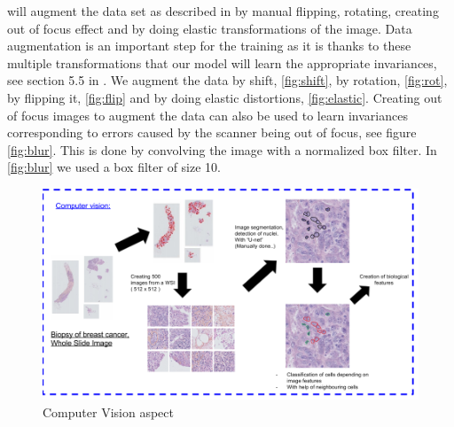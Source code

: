 \documentclass[a4paper,10pt]{article}
\begin{document}
will augment the data set as described in \citet{UNet} by manual
flipping, rotating, creating out of focus effect and by doing elastic
transformations of the image. Data augmentation is an important step
for the training as it is thanks to these multiple transformations
that our model will learn the appropriate invariances,  see section
5.5 in \citep{bishop2006pattern}. We augment the data by shift,
\ref{fig:shift}, by rotation, \ref{fig:rot}, by flipping it,
\ref{fig:flip} and by doing elastic distortions,
\ref{fig:elastic}. Creating out of focus images to augment the data
can also be used to learn invariances corresponding to errors caused
by the scanner being out of focus, see figure \ref{fig:blur}. This is
done by convolving the image with a normalized box filter. In
\ref{fig:blur} we used a box filter of size 10.  


\begin{figure}[!ht]
\centering
\includegraphics[width=\textwidth]{ComputerVision.png}
\caption{Computer Vision aspect}
\label{ComputerVision}
\end{figure}
\end{document}

